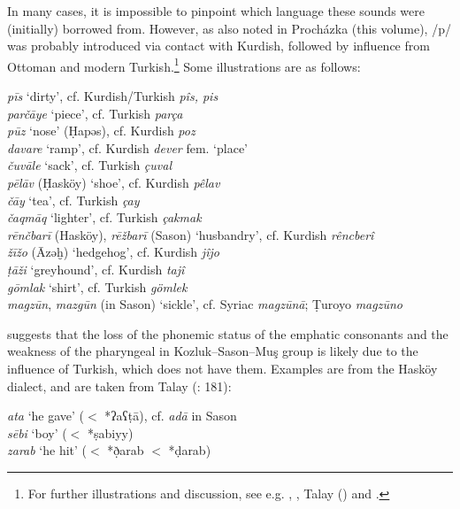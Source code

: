 \documentclass[output=paper]{langsci/langscibook}
\begin{document}
In many cases, it is impossible to pinpoint which language these sounds were (initially) borrowed from. However, as also noted in Proch\'{a}zka (this volume), /p/ was probably introduced via contact with Kurdish, followed by influence from Ottoman and modern Turkish.\footnote{For further illustrations and discussion, see e.g. \citet{VockeWaldner1982}, \citet{Jastrow2011anatolian}, Talay (\citeyear{Talay2002,Talay2007}) and \citet{GrigoreBituna2012}.} Some illustrations are as follows:

\ea 
\noindent \textit{p\={i}s} `dirty', cf. Kurdish/Turkish \textit{p\^{i}s, pis}\\
\textit{par\v{c}\={a}ye} `piece', cf. Turkish \textit{par\c{c}a}\\
\textit{p\={u}z} `nose' (\d{H}apəs), cf. Kurdish \textit{poz}\\ 
\textit{davare} `ramp', cf. Kurdish \textit{dever} fem. `place'\\
\textit{\v{c}uv\={a}le} `sack', cf. Turkish \textit{\c{c}uval} \\
\textit{pēlāv} (\d{H}ask\"{o}y) `shoe', cf. Kurdish \textit{p\^{e}lav}\\
\textit{\v{c}\={a}y} `tea', cf. Turkish \textit{\c{c}ay}\\
\textit{\v{c}aqm\={a}q} `lighter', cf. Turkish \textit{\c{c}akmak}\\
\textit{rēnčbarī} (Hasköy), \textit{rē\v{z}barī} (Sason) `husbandry', cf. Kurdish \textit{rêncberî}\\
\textit{žīžo} (Āzəḫ) `hedgehog', cf. Kurdish \textit{jîjo} \\
\textit{ṭāži} `greyhound', cf. Kurdish \textit{tajî} \\
\textit{g\={o}mlak} `shirt', cf. Turkish \textit{g\"{o}mlek}\\
\textit{magz\={u}n}, \textit{mazg\={u}n} (in Sason) `sickle', cf. Syriac \textit{magz\={u}n\={a}}; \d{T}uroyo \textit{magz\={u}no}\\
\z

\cite{Talay2007} suggests that the loss of the phonemic status of the emphatic consonants and the weakness of the pharyngeal in Kozluk--Sason--Mu\c{s} group is likely due to the influence of Turkish, which does not have them. Examples are from the Hask\"{o}y dialect, and are taken from Talay (\citeyear{Talay2007}: 181):

\ea
\noindent \textit{ata} `he gave' ($<$ *ʔaʕ\d{t}ā), cf. \textit{ad\={a}} in Sason\\
\textit{sēbi} `boy' ($<$ *\d{s}abiyy)\\
\textit{zarab} `he hit' ($<$ *\d{ð}arab $<$ *\d{d}arab)\\
\z
\end{document}
